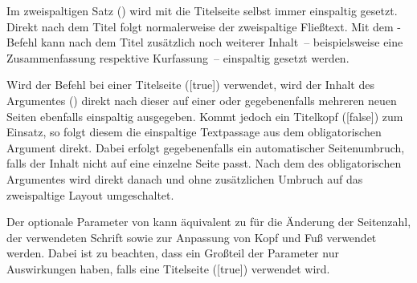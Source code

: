 \begin{Declaration}{%
}
\printdeclarationlist%
%
%
%
%
Im zweispaltigen Satz () wird mit  die 
Titelseite selbst immer einspaltig gesetzt. Direkt nach dem Titel folgt 
normalerweise der zweispaltige Fließtext. Mit dem \TUDScript-Befehl 
 kann nach dem Titel zusätzlich noch weiterer 
Inhalt~-- beispielsweise eine Zusammenfassung respektive Kurfassung~-- 
einspaltig gesetzt werden.

Wird der Befehl bei einer Titelseite ([true]) verwendet, wird 
der Inhalt des Argumentes () direkt nach dieser auf einer 
oder gegebenenfalls mehreren neuen Seiten ebenfalls einspaltig ausgegeben. 
Kommt jedoch ein Titelkopf ([false]) zum Einsatz, so folgt 
diesem die einspaltige Textpassage aus dem obligatorischen Argument direkt. 
Dabei erfolgt gegebenenfalls ein automatischer Seitenumbruch, falls der Inhalt 
nicht auf eine einzelne Seite passt. Nach dem  des 
obligatorischen Argumentes wird direkt danach und ohne zusätzlichen Umbruch auf 
das zweispaltige Layout umgeschaltet.

Der optionale Parameter von  kann äquivalent zu 
 für die Änderung der Seitenzahl, der verwendeten Schrift 
sowie zur Anpassung von Kopf und Fuß verwendet werden. Dabei ist zu beachten, 
dass ein Großteil der Parameter nur Auswirkungen haben, falls eine Titelseite
([true]) verwendet wird.
\end{Declaration}

